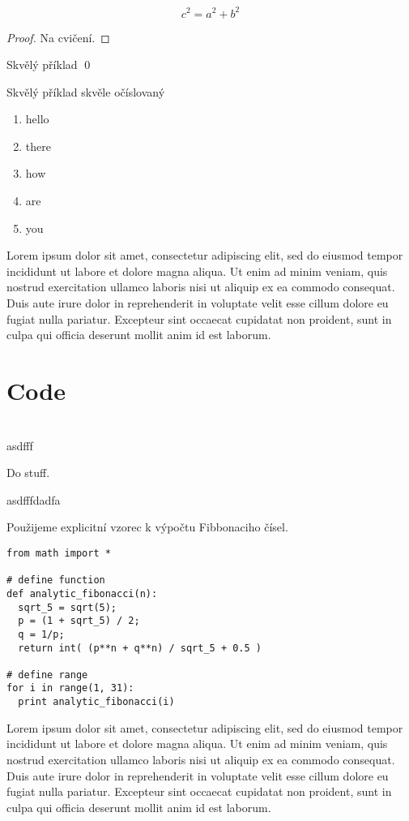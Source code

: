 \documentclass{article}
\begin{document}
\begin{thm}[Pythagorova]
	\[c^2 = a^2+b^2 \]
\end{thm}
\begin{proof}
	Na cvičení.
\end{proof}
\begin{examp}
	Skvělý příklad \qed
\end{examp}
\begin{examp}
	Skvělý příklad skvěle očíslovaný
	\begin{enumerate}
		\item hello
		\item there
		\item how
		\item are
		\item you
	\end{enumerate}
\end{examp}


Lorem ipsum dolor sit amet, consectetur adipiscing elit, sed do eiusmod tempor
incididunt ut labore et dolore magna aliqua. Ut enim ad minim veniam, quis
nostrud exercitation ullamco laboris nisi ut aliquip ex ea commodo consequat.
Duis aute irure dolor in reprehenderit in voluptate velit esse cillum dolore eu
fugiat nulla pariatur. Excepteur sint occaecat cupidatat non proident, sunt in
culpa qui officia deserunt mollit anim id est laborum.


\section{Code}

\begin{algo}[asdf]\ \\
	\AlgIn asdfff
	\begin{algorithmic}[1]
		\State Do stuff.
	\end{algorithmic}
	\AlgOut asdfffdadfa
\end{algo}

\begin{algo} Použijeme explicitní vzorec k výpočtu
	Fibbonaciho čísel.
	\begin{lstlisting}[label={list:first}]
from math import *

# define function 
def analytic_fibonacci(n):
  sqrt_5 = sqrt(5);
  p = (1 + sqrt_5) / 2;
  q = 1/p;
  return int( (p**n + q**n) / sqrt_5 + 0.5 )
 
# define range
for i in range(1, 31):
  print analytic_fibonacci(i)
\end{lstlisting}
\end{algo}
Lorem ipsum dolor sit amet, consectetur adipiscing elit, sed do eiusmod tempor
incididunt ut labore et dolore magna aliqua. Ut enim ad minim veniam, quis
nostrud exercitation ullamco laboris nisi ut aliquip ex ea commodo consequat.
Duis aute irure dolor in reprehenderit in voluptate velit esse cillum dolore eu
fugiat nulla pariatur. Excepteur sint occaecat cupidatat non proident, sunt in
culpa qui officia deserunt mollit anim id est laborum.
\end{document}
